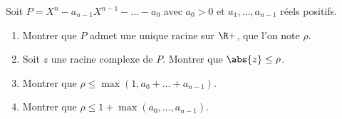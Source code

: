 \begin{enonce}
\begin{exercise}[ID={RMS133 E1274},subtitle={IMT MP 2022},tags={mpsi},difficulty={}]
  Soit $P=X^n - a_{n-1} X^{n-1} - \dots - a_0$ avec $a_0>0$ et $a_1,\dots,a_{n-1}$ réels positifs.
  \begin{enumerate}
    \item Montrer que $P$ admet une unique racine sur $\R+$, que l'on note $\rho$.
    \item Soit $z$ une racine complexe de $P$. Montrer que $\abs{z}\leq\rho$.
    \item Montrer que $\rho\leq \max\left( 1, a_0 + \dots + a_{n-1} \right)$.
    \item Montrer que $\rho\leq  1 + \max\left( a_0, \dots, a_{n-1} \right)$.
  \end{enumerate}
\end{exercise}
\begin{comment}
  \begin{enumerate}
    \item Récurrence et étude de fonction.

    \item Avec l'inégalité triangulaire, $P(\abs{z})\leq 0$, d'où $\abs{z}\leq \rho$ d'après l'étude de fonction.

    \item Si $\rho>1$, alors
      \begin{equation*}
        \rho = a_{n-1} + \dots + \frac{a_{0}}{\rho^{n-1}} \leq a_{n-1} + \dots + a_{0}.
      \end{equation*}

    \item Avec $M=\max\set{a_0,\dots, a_{n-1}}$,
      \begin{equation*}
        \rho^n \leq M (\rho^{n-1}+\dots+1) = M \frac{\rho^n - 1}{\rho - 1},
      \end{equation*}
      d'où $\rho-1\leq (\rho - 1) \frac{\rho^n}{\rho - 1} \leq M$.
  \end{enumerate}
\end{comment}
\end{enonce}
